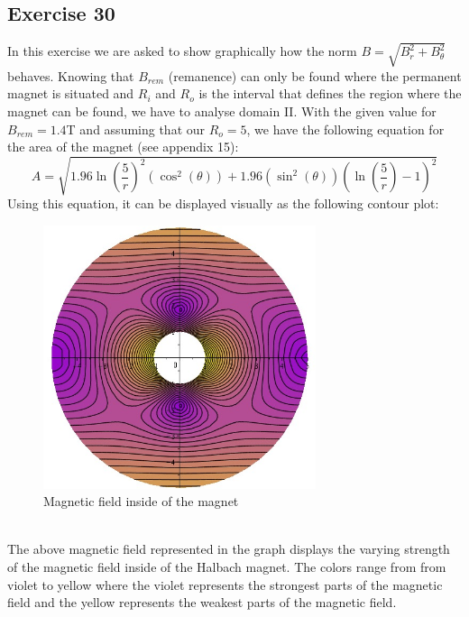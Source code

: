 \documentclass{article}
\begin{document}
\subsection{Exercise 30}
In this exercise we are asked to show graphically how the norm $B = 
\sqrt{B_{r}^{2}+B_{\theta}^{2}}$ behaves. Knowing that $B_{rem}$ (remanence) can only be found where the permanent magnet is situated and $R_{i}$ and $R_{o}$ is the interval that defines the region where the magnet can be found, we have to analyse domain II. With the given value for $B_{rem}=1.4$T and assuming that our $R_{o}=5$, we have the following equation for the area of the magnet (see appendix 15):
\begin{equation}
    A = 
\sqrt{ 1.96 \ln \! \left(\frac{5}{r}\right)^{2} \left(\cos^{2}\left(\theta \right)\right)+ 1.96 \left(\sin^{2}\left(\theta \right)\right) \left(\ln \! \left(\frac{5}{r}\right)-1\right)^{2}}
\end{equation}
Using this equation, it can be displayed visually as the following contour plot: 
\begin{figure}[h!]
\includegraphics[width=8cm]{imagem_ex_30.jpeg}
\centering
\caption{Magnetic field inside of the magnet}
\end{figure}
\\
The above magnetic field represented in the graph displays the varying strength of the magnetic field inside of the Halbach magnet. The colors range from from violet to yellow where the violet represents the strongest parts of the magnetic field and the yellow represents the weakest parts of the magnetic field. 
\end{document}
